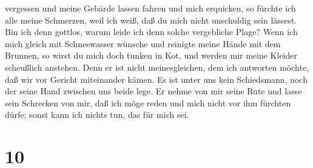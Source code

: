 vergessen und meine Gebärde lassen fahren und mich erquicken,
 so fürchte ich alle meine Schmerzen, weil ich weiß, daß du
mich nicht unschuldig sein lässest.  Bin ich denn gottlos,
warum leide ich denn solche vergebliche Plage?  Wenn ich
mich gleich mit Schneewasser wünsche und reinigte meine Hände mit dem
Brunnen,  so wirst du mich doch tunken in Kot, und werden
mir meine Kleider scheußlich anstehen.  Denn er ist nicht
meinesgleichen, dem ich antworten möchte, daß wir vor Gericht
miteinander kämen.  Es ist unter uns kein Schiedsmann, noch
der seine Hand zwischen uns beide lege.  Er nehme von mir
seine Rute und lasse sein Schrecken von mir,  daß ich möge
reden und mich nicht vor ihm fürchten dürfe; sonst kann ich nichts tun,
das für mich sei.

\hypertarget{section-9}{%
\section{10}\label{section-9}}

